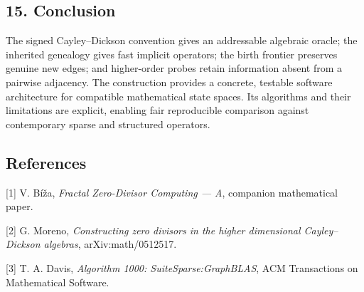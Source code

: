 \documentclass[
  10pt,
]{article}
\begin{document}
\subsection{15. Conclusion}\label{conclusion}

The signed Cayley--Dickson convention gives an addressable algebraic
oracle; the inherited genealogy gives fast implicit operators; the birth
frontier preserves genuine new edges; and higher-order probes retain
information absent from a pairwise adjacency. The construction provides
a concrete, testable software architecture for compatible mathematical
state spaces. Its algorithms and their limitations are explicit,
enabling fair reproducible comparison against contemporary sparse and
structured operators.

\subsection{References}\label{references}

{[}1{]} V. Bíža, \emph{Fractal Zero-Divisor Computing --- A}, companion
mathematical paper.

{[}2{]} G. Moreno, \emph{Constructing zero divisors in the higher
dimensional Cayley--Dickson algebras}, arXiv:math/0512517.

{[}3{]} T. A. Davis, \emph{Algorithm 1000: SuiteSparse:GraphBLAS}, ACM
Transactions on Mathematical Software.
\end{document}
